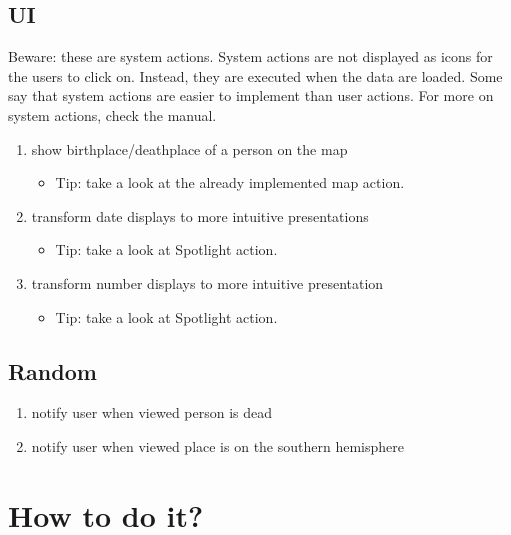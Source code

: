 \documentclass{article}
\begin{document}
\subsection{UI}
Beware: these are system actions. System actions are not displayed as icons for the users to click on. Instead, they are executed when the data are loaded. Some say that system actions are easier to implement than user actions. For more on system actions, check the manual.
\begin{enumerate}
\item show birthplace/deathplace of a person on the map
\begin{itemize}
\item Tip: take a look at the already implemented map action.
\end{itemize}
\item transform date displays to more intuitive presentations
\begin{itemize}
\item Tip: take a look at Spotlight action.
\end{itemize}
\item transform number displays to more intuitive presentation
\begin{itemize}
\item Tip: take a look at Spotlight action.
\end{itemize}
\end{enumerate}

\subsection{Random}
\begin{enumerate}
\item notify user when viewed person is dead
\item notify user when viewed place is on the southern hemisphere
\end{enumerate}


\section{How to do it?}
\end{document}
